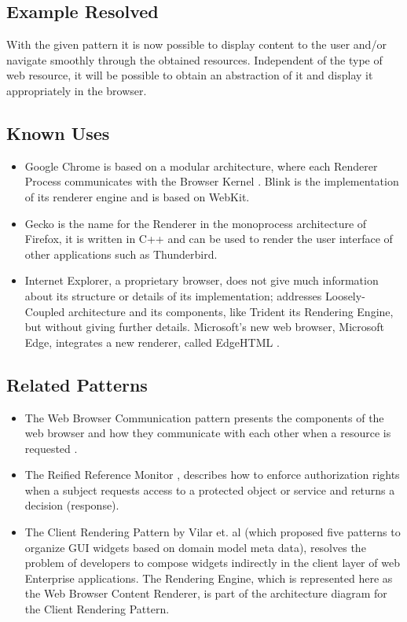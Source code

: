 \documentclass[]{acmlarge}
\begin{document}
  \subsection*{Example Resolved}
With the given pattern it is now possible to display content to the user and/or navigate smoothly through the obtained resources. Independent of the type of web resource, it will be possible to obtain an abstraction of it and display it appropriately in the browser. 
  \subsection*{Known Uses}
  \begin{itemize}\leftskip0.2em
    \item Google Chrome is based on a modular architecture, where each Renderer Process communicates with the Browser Kernel \cite{multiProcGC}. Blink is the implementation of its renderer engine and is based on WebKit.
    \item Gecko \cite{gecko2} is the name for the Renderer in the monoprocess architecture of Firefox, it is written in C++ and can be used to render the user interface of other applications such as Thunderbird.
    \item Internet Explorer, a proprietary browser, does not give much information about its structure or details of its implementation; \cite{Crowley2010} addresses Loosely-Coupled architecture \cite{IE8-LCIE} and its components, like Trident its Rendering Engine, but without giving further details. Microsoft's new web browser, Microsoft Edge, integrates a new renderer, called EdgeHTML \cite{edgehtml}.
  \end{itemize}

  \subsection*{Related Patterns}
  \begin{itemize}\leftskip0.2em
    \item The Web Browser Communication pattern presents the components of the web browser and how they communicate with each other when a resource is requested \cite{silva2015}. 
    \item The Reified Reference Monitor \cite{fernandez2013security}, describes how to enforce authorization rights when a subject requests access to a protected object or service and returns a decision (response). 
    \item The Client Rendering Pattern by Vilar et. al \cite{Vilar2015} (which proposed five patterns to organize GUI widgets based on domain model meta data), resolves the problem of developers to compose widgets indirectly in the client layer of web Enterprise applications. The Rendering Engine, which is represented here as the Web Browser Content Renderer, is part of the architecture diagram for the Client Rendering Pattern.
  \end{itemize}
\end{document}
